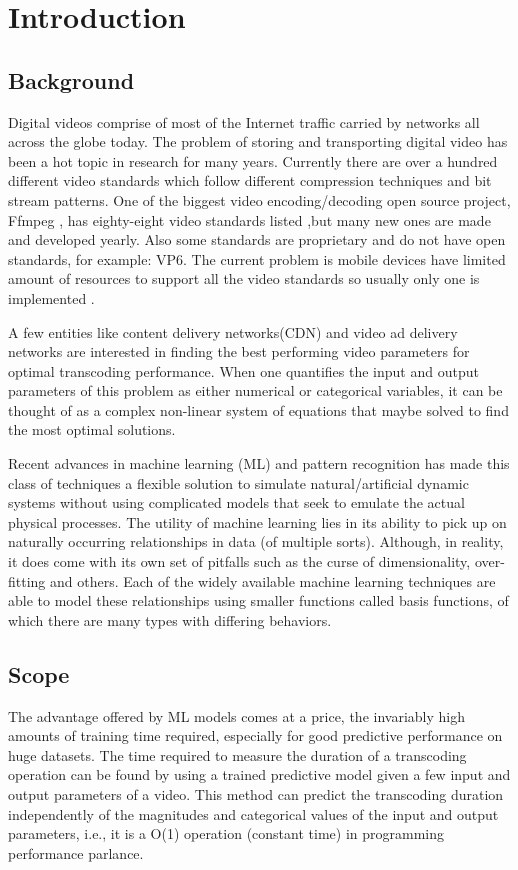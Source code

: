 \documentclass[letterpaper,12pt,titlepage,oneside,final]{report}
\begin{document}
\cleardoublepage

\chapter{Introduction}
    \section{Background}
        Digital videos comprise of most of the Internet traffic carried by networks all across the globe today. The problem of storing and transporting digital video has been a hot topic in research for many years. Currently there are over a hundred different video standards which follow different compression techniques and bit stream patterns. One of the biggest video encoding/decoding open source project, Ffmpeg \cite{ffmpeg:online}, has eighty-eight video standards listed ,but many new ones are made and developed yearly. Also some standards are proprietary and do not have open standards, for example: VP6. The current problem is mobile devices have limited amount of resources to support all the video standards so usually only one is implemented \cite{Holder2008}. 

        A few entities like content delivery networks(CDN) and video ad delivery networks are interested in finding the best performing video parameters for optimal transcoding performance. When one quantifies the input and output parameters of this problem as either numerical or categorical variables, it can be thought of as a complex non-linear system of equations that maybe solved to find the most optimal solutions.

        Recent advances in machine learning (ML) and pattern recognition has made this class of techniques a flexible solution to simulate natural/artificial dynamic systems without using complicated models that seek to emulate the actual physical processes. The utility of machine learning lies in its ability to pick up on naturally occurring relationships in data (of multiple sorts). Although, in reality, it does come with its own set of pitfalls such as the curse of dimensionality, over-fitting and others. Each of the widely available machine learning techniques are able to model these relationships using smaller functions called basis functions, of which there are many types with differing behaviors. 

    \section{Scope}
        The advantage offered by ML models comes at a price, the invariably high amounts of training time required, especially for good predictive performance on huge datasets. The time required to measure the duration of a transcoding operation can be found by using a trained predictive model given a few input and output parameters of a video. This method can predict the transcoding duration independently of the magnitudes and categorical values of the input and output parameters, i.e., it is a O(1) operation (constant time) in programming performance parlance.
\end{document}

